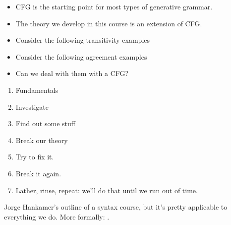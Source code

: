 \documentclass[a4paper,landscape,headrule,footrule]{foils}
\begin{document}

\begin{itemize}
\item CFG is the starting point for most
types of generative grammar.

\item The theory we develop in this course is an
extension of CFG.
\end{itemize}


\begin{itemize}
\item Consider the following transitivity examples
  \begin{exe}
    \ex {}
    \ex {}
    \ex *
    \ex *
  \end{exe}
\item Consider the following agreement examples
  \begin{exe}
    \ex {}
    \ex {}
    \ex *
    \ex *
  \end{exe}
\item Can we deal with them with a CFG?
\end{itemize}

\begin{enumerate}\addtolength{\itemsep}{-1ex}
\item Fundamentals
\item Investigate
\item Find out some stuff
\item Break our theory
\item Try to fix it.
\item Break it again.
\item Lather, rinse, repeat: we'll do that until we run out of time.
\end{enumerate}

Jorge Hankamer's outline of a syntax course, but it's pretty
applicable to everything we do.  More formally: .
\end{document}
